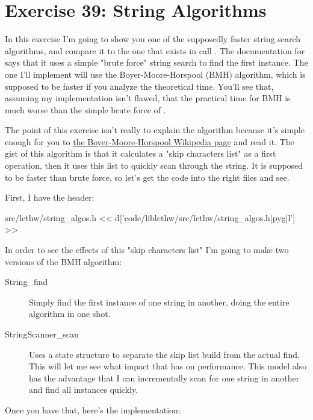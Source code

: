 \chapter{Exercise 39: String Algorithms}

In this exercise I'm going to show you one of the supposedly faster string
search algorithms, and compare it to the one that exists in 
call .  The documentation for  says that it uses a
simple "brute force" string search to find the first instance.  The one I'll
implement will use the Boyer-Moore-Horspool (BMH) algorithm, which is supposed
to be faster if you analyze the theoretical time.  You'll see that, assuming my
implementation isn't flawed, that the practical time for BMH is much worse than
the simple brute force of .

The point of this exercise isn't really to explain the algorithm because it's
simple enough for you to
\href{http://en.wikipedia.org/wiki/Boyer\%E2\%80\%93Moore\%E2\%80\%93Horspool\_algorithm}{the
Boyer-Moore-Horspool Wikipedia page} and read it.  The gist of this algorithm
is that it calculates a "skip characters list" as a first operation, then it
uses this list to quickly scan through the string.  It is supposed to be faster
than brute force, so let's get the code into the right files and see.

First, I have the header:

\begin{code}{src/lcthw/string\_algos.h}
<< d['code/liblcthw/src/lcthw/string_algos.h|pyg|l'] >>
\end{code}

In order to see the effects of this "skip characters list" I'm going to make
two versions of the BMH algorithm:

\begin{description}
\item[String\_find] Simply find the first instance of one string in another,
    doing the entire algorithm in one shot.
\item[StringScanner\_scan] Uses a  state structure to
    separate the skip list build from the actual find.  This will let me
    see what impact that has on performance.  This model also has the advantage
    that I can incrementally scan for one string in another and find all 
    instances quickly.
\end{description}

Once you have that, here's the implementation:

